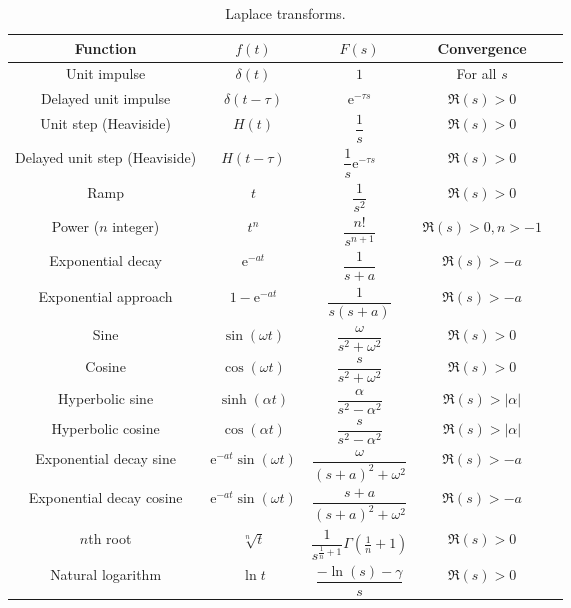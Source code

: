 \documentclass[fleqn]{article}
\newcommand{\me}{\mathrm{e}}
\begin{document}
\begin{table}[!p]
\centering
\caption{Laplace transforms.}
\label{tab:laplacetransforms}
\renewcommand{\arraystretch}{2}
\renewcommand{\tabcolsep}{0.4cm}
\begin{tabular}{ccScc}
\toprule
Function & $f(t)$ & $F(s)$ & Convergence\\
\midrule
Unit impulse & $\delta(t)$ & $1$ & For all $s$ \\
Delayed unit impulse & $\delta(t-\tau)$ & $\me^{-\tau s}$ & $\Re(s)>0$ \\
Unit step (Heaviside) & $H(t)$ & $\dfrac{1}{s}$ & $\Re(s)>0$ \\
Delayed unit step (Heaviside) & $H(t-\tau)$ & $\dfrac{1}{s}\me^{-\tau s}$ & $\Re(s)>0$ \\
Ramp & $t$ & $\dfrac{1}{s^2}$ & $\Re(s)>0$ \\
Power ($n$ integer) & $t^n$ & $\dfrac{n!}{s^{n+1}}$ & $\Re(s)>0, n>-1$ \\
Exponential decay & $\me^{-at}$ & $\dfrac{1}{s+a}$ & $\Re(s)>-a$ \\
Exponential approach & $1-\me^{-at}$ & $\dfrac{1}{s(s+a)}$ & $\Re(s)>-a$ \\
Sine & $\sin(\omega t)$ & $\dfrac{\omega}{s^2 + \omega^2}$ & $\Re(s)>0$ \\
Cosine & $\cos(\omega t)$ & $\dfrac{s}{s^2 + \omega^2}$ & $\Re(s)>0$ \\
Hyperbolic sine & $\sinh(\alpha t)$ & $\dfrac{\alpha}{s^2-\alpha^2}$ & $\Re(s)> |\alpha|$ \\
Hyperbolic cosine & $\cos(\alpha t)$ & $\dfrac{s}{s^2-\alpha^2}$ & $\Re(s)> |\alpha|$ \\
Exponential decay sine & $\me^{-at}\sin(\omega t)$ & $\dfrac{\omega}{(s+a)^2 + \omega^2}$ & $\Re(s)>-a$ \\
Exponential decay cosine & $\me^{-at}\sin(\omega t)$ & $\dfrac{s+a}{(s+a)^2 + \omega^2}$ & $\Re(s)>-a$ \\
$n$th root & $\sqrt[n]{t}$ & $\dfrac{1}{s^{\frac{1}{n}+1}}\Gamma\left(\frac{1}{n}+1\right)$ & $\Re(s)>0$ \\
Natural logarithm & $\ln t$ & $\dfrac{-\ln (s) -\gamma}{s}$ & $\Re(s)>0$ \\
\bottomrule
\end{tabular}
\end{table}
\end{document}

